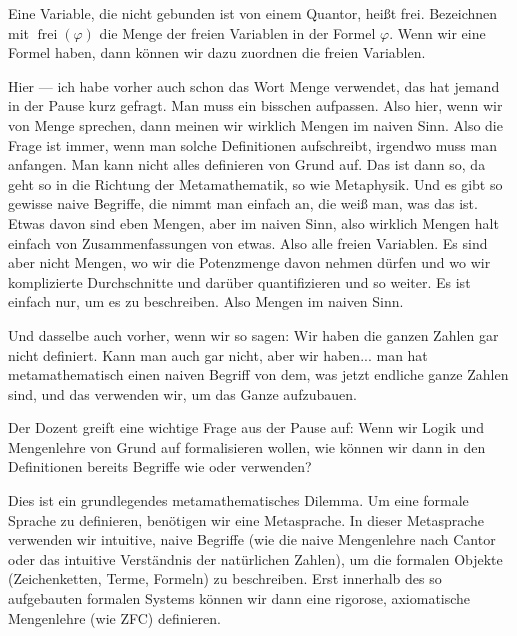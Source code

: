 \begin{spoken-clean}[01:10:37 - 01:12:22]
Eine Variable, die nicht gebunden ist von einem Quantor, heißt frei. Bezeichnen mit $\operatorname{frei}(\varphi)$ die Menge der freien Variablen in der Formel $\varphi$. Wenn wir eine Formel haben, dann können wir dazu zuordnen die freien Variablen.

Hier  --- ich habe vorher auch schon das Wort Menge verwendet, das hat jemand in der Pause kurz gefragt. Man muss ein bisschen aufpassen. Also hier, wenn wir von Menge sprechen, dann meinen wir wirklich Mengen im naiven Sinn. Also die Frage ist immer, wenn man solche Definitionen aufschreibt, irgendwo muss man anfangen. Man kann nicht alles definieren von Grund auf. Das ist dann so, da geht so in die Richtung der Metamathematik, so wie Metaphysik. Und es gibt so gewisse naive Begriffe, die nimmt man einfach an, die weiß man, was das ist. Etwas davon sind eben Mengen, aber im naiven Sinn, also wirklich Mengen halt einfach von Zusammenfassungen von etwas. Also alle freien Variablen. Es sind aber nicht Mengen, wo wir die Potenzmenge davon nehmen dürfen und wo wir komplizierte Durchschnitte und darüber quantifizieren und so weiter. Es ist einfach nur, um es zu beschreiben. Also Mengen im naiven Sinn.

Und dasselbe auch vorher, wenn wir so sagen:  Wir haben die ganzen Zahlen gar nicht definiert. Kann man auch gar nicht, aber wir haben... man hat metamathematisch einen naiven Begriff von dem, was jetzt endliche ganze Zahlen sind, und das verwenden wir, um das Ganze aufzubauen.
\end{spoken-clean}

\begin{didactic-insight}
Der Dozent greift eine wichtige Frage aus der Pause auf: Wenn wir Logik und Mengenlehre von Grund auf formalisieren wollen, wie können wir dann in den Definitionen bereits Begriffe wie  oder  verwenden? 

Dies ist ein grundlegendes metamathematisches Dilemma. Um eine formale Sprache zu definieren, benötigen wir eine Metasprache. In dieser Metasprache verwenden wir intuitive, naive Begriffe (wie die naive Mengenlehre nach Cantor oder das intuitive Verständnis der natürlichen Zahlen), um die formalen Objekte (Zeichenketten, Terme, Formeln) zu beschreiben. Erst innerhalb des so aufgebauten formalen Systems können wir dann eine rigorose, axiomatische Mengenlehre (wie ZFC) definieren.
\end{didactic-insight}


